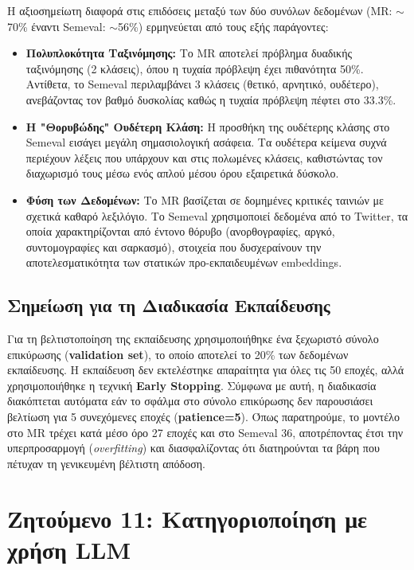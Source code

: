 \documentclass[12pt]{article}
\begin{document}
Η αξιοσημείωτη διαφορά στις επιδόσεις μεταξύ των δύο συνόλων δεδομένων (MR: $\sim$70\% έναντι Semeval: $\sim$56\%) ερμηνεύεται από τους εξής παράγοντες:

\begin{itemize}
    \item \textbf{Πολυπλοκότητα Ταξινόμησης:} Το MR αποτελεί πρόβλημα δυαδικής ταξινόμησης (2 κλάσεις), όπου η τυχαία πρόβλεψη έχει πιθανότητα 50\%. Αντίθετα, το Semeval περιλαμβάνει 3 κλάσεις (θετικό, αρνητικό, ουδέτερο), ανεβάζοντας τον βαθμό δυσκολίας καθώς η τυχαία πρόβλεψη πέφτει στο 33.3\%.
    \item \textbf{Η "Θορυβώδης" Ουδέτερη Κλάση:} Η προσθήκη της ουδέτερης κλάσης στο Semeval εισάγει μεγάλη σημασιολογική ασάφεια. Τα ουδέτερα κείμενα συχνά περιέχουν λέξεις που υπάρχουν και στις πολωμένες κλάσεις, καθιστώντας τον διαχωρισμό τους μέσω ενός απλού μέσου όρου εξαιρετικά δύσκολο.
    \item \textbf{Φύση των Δεδομένων:} Το MR βασίζεται σε δομημένες κριτικές ταινιών με σχετικά καθαρό λεξιλόγιο. Το Semeval χρησιμοποιεί δεδομένα από το Twitter, τα οποία χαρακτηρίζονται από έντονο θόρυβο (ανορθογραφίες, αργκό, συντομογραφίες και σαρκασμό), στοιχεία που δυσχεραίνουν την αποτελεσματικότητα των στατικών προ-εκπαιδευμένων embeddings.
\end{itemize}

\subsection*{Σημείωση για τη Διαδικασία Εκπαίδευσης}

Για τη βελτιστοποίηση της εκπαίδευσης χρησιμοποιήθηκε ένα ξεχωριστό σύνολο επικύρωσης (\textbf{validation set}), το οποίο αποτελεί το 20\% των δεδομένων εκπαίδευσης. Η εκπαίδευση δεν εκτελέστηκε απαραίτητα για όλες τις 50 εποχές, αλλά χρησιμοποιήθηκε η τεχνική \textbf{Early Stopping}. Σύμφωνα με αυτή, η διαδικασία διακόπτεται αυτόματα εάν το σφάλμα στο σύνολο επικύρωσης δεν παρουσιάσει βελτίωση για 5 συνεχόμενες εποχές (\textbf{patience=5}). Όπως παρατηρούμε, το μοντέλο στο MR τρέχει κατά μέσο όρο 27 εποχές και στο Semeval 36, αποτρέποντας έτσι την υπερπροσαρμογή (\textit{overfitting}) και διασφαλίζοντας ότι διατηρούνται τα βάρη που πέτυχαν τη γενικευμένη βέλτιστη απόδοση.

\section{Ζητούμενο 11: Κατηγοριοποίηση με χρήση LLM}
\end{document}
